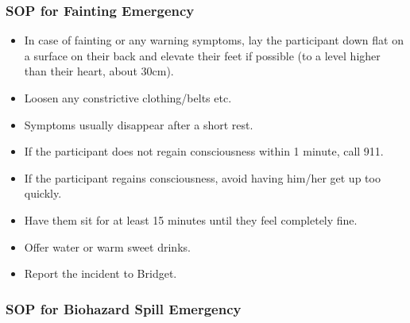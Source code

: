 \documentclass[]{book}
\providecommand{\tightlist}{%
  \setlength{\itemsep}{0pt}\setlength{\parskip}{0pt}}
\begin{document}
\hypertarget{sop-for-fainting-emergency}{%
\subsubsection{SOP for Fainting Emergency}\label{sop-for-fainting-emergency}}

\begin{itemize}
\tightlist
\item
  In case of fainting or any warning symptoms, lay the participant down flat on a surface on their back and elevate their feet if possible (to a level higher than their heart, about 30cm).
\item
  Loosen any constrictive clothing/belts etc.
\item
  Symptoms usually disappear after a short rest.
\item
  If the participant does not regain consciousness within 1 minute, call 911.
\item
  If the participant regains consciousness, avoid having him/her get up too quickly.
\item
  Have them sit for at least 15 minutes until they feel completely fine.
\item
  Offer water or warm sweet drinks.
\item
  Report the incident to Bridget.
\end{itemize}

\hypertarget{sop-for-biohazard-spill-emergency}{%
\subsubsection{SOP for Biohazard Spill Emergency}\label{sop-for-biohazard-spill-emergency}}
\end{document}
